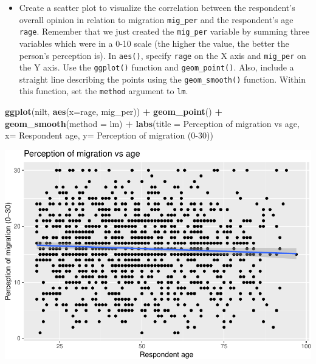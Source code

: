 \documentclass[
]{book}
\newenvironment{Shaded}{\begin{snugshade}}{\end{snugshade}}
\newcommand{\AttributeTok}[1]{\textcolor[rgb]{0.13,0.29,0.53}{#1}}
\newcommand{\FunctionTok}[1]{\textcolor[rgb]{0.13,0.29,0.53}{\textbf{#1}}}
\newcommand{\NormalTok}[1]{#1}
\newcommand{\SpecialCharTok}[1]{\textcolor[rgb]{0.81,0.36,0.00}{\textbf{#1}}}
\newcommand{\StringTok}[1]{\textcolor[rgb]{0.31,0.60,0.02}{#1}}
\providecommand{\tightlist}{%
  \setlength{\itemsep}{0pt}\setlength{\parskip}{0pt}}
\begin{document}
\begin{itemize}
\tightlist
\item
  Create a scatter plot to visualize the correlation between the respondent's overall opinion in relation to migration \texttt{mig\_per} and the respondent's age \texttt{rage}. Remember that we just created the \texttt{mig\_per} variable by summing three variables which were in a 0-10 scale (the higher the value, the better the person's perception is). In \texttt{aes()}, specify \texttt{rage} on the X axis and \texttt{mig\_per} on the Y axis. Use the \texttt{ggplot()} function and \texttt{geom\_point()}. Also, include a straight line describing the points using the \texttt{geom\_smooth()} function. Within this function, set the \texttt{method} argument to \texttt{\textquotesingle{}lm\textquotesingle{}}.
\end{itemize}

\begin{Shaded}
\begin{Highlighting}[]
\FunctionTok{ggplot}\NormalTok{(nilt, }\FunctionTok{aes}\NormalTok{(}\AttributeTok{x=}\NormalTok{rage, mig\_per)) }\SpecialCharTok{+}
  \FunctionTok{geom\_point}\NormalTok{() }\SpecialCharTok{+}
  \FunctionTok{geom\_smooth}\NormalTok{(}\AttributeTok{method =} \StringTok{\textquotesingle{}lm\textquotesingle{}}\NormalTok{) }\SpecialCharTok{+}
  \FunctionTok{labs}\NormalTok{(}\AttributeTok{title =} \StringTok{\textquotesingle{}Perception of migration vs age\textquotesingle{}}\NormalTok{,}
       \AttributeTok{x=} \StringTok{\textquotesingle{}Respondent age\textquotesingle{}}\NormalTok{, }\AttributeTok{y=} \StringTok{\textquotesingle{}Perception of migration (0{-}30)\textquotesingle{}}\NormalTok{)}
\end{Highlighting}
\end{Shaded}

\begin{flushleft}\includegraphics[width=1\linewidth]{lab-workbook_files/figure-latex/unnamed-chunk-135-1} \end{flushleft}
\end{document}
